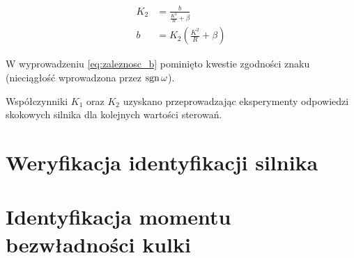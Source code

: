 \begin{align}
    K_2 &= \frac{b}{\frac{K^2}{R} + \beta} \nonumber \\
    b &= K_2 \left(\frac{K^2}{R} + \beta \right) \label{eq:zaleznosc_b}
\end{align}

W wyprowadzeniu \eqref{eq:zaleznosc_b} pominięto kwestie zgodności znaku (nieciągłość wprowadzona przez $\operatorname{sgn} \omega$).

Współczynniki $K_1$ oraz $K_2$ uzyskano przeprowadzając eksperymenty odpowiedzi skokowych silnika dla kolejnych wartości sterowań.


\section{Weryfikacja identyfikacji silnika}
\label{sec:ch6_weryfikacja_identyfikacji_silnika}

\section{Identyfikacja momentu bezwładności kulki}
\label{sec:ch6_identyfikacja_bezwladnosci_kulki}

